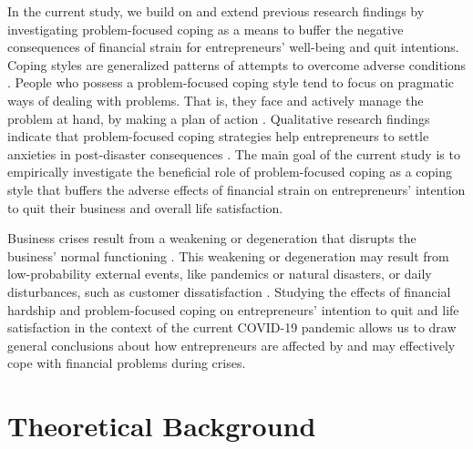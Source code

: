 \documentclass[man]{apa7}
\begin{document}
In the current study, we build on and extend previous research findings by investigating problem-focused coping as a means to buffer the negative consequences of financial strain for entrepreneurs' well-being and quit intentions. 
Coping styles are generalized patterns of attempts to overcome adverse conditions \parencite[e.g.,][]{Carver1994}. 
People who possess a problem-focused coping style tend to focus on pragmatic ways of dealing with problems.
That is, they face and actively manage the problem at hand, by making a plan of action \parencite{Folkman1984, Folkman2004}.
Qualitative research findings indicate that problem-focused coping strategies help entrepreneurs to settle anxieties in post-disaster consequences \parencite{Fang2020}. 
The main goal of the current study is to empirically investigate the beneficial role of problem-focused coping as a coping style that buffers the adverse effects of financial strain on entrepreneurs' intention to quit their business and overall life satisfaction. \par 

Business crises result from a weakening or degeneration that disrupts the business' normal functioning \parencite{Williams2017a}.
This weakening or degeneration may result from low-probability external events, like pandemics or natural disasters, or daily disturbances, such as customer dissatisfaction \parencite{Doern2019}.
Studying the effects of financial hardship and problem-focused coping on entrepreneurs' intention to quit and life satisfaction in the context of the current COVID-19 pandemic allows us to draw general conclusions about how entrepreneurs are affected by and may effectively cope with financial problems during crises. 

\section{Theoretical Background}
\end{document}
